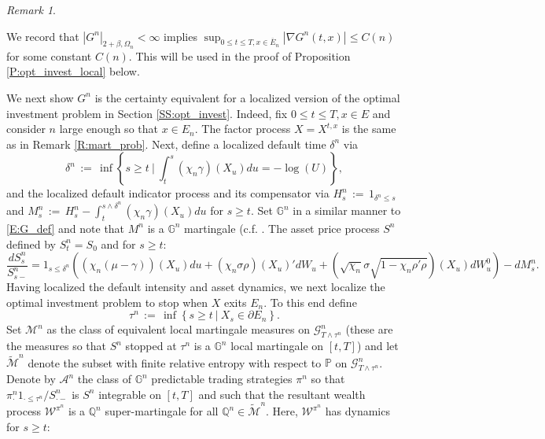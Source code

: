 \documentclass[11pt, letterpaper]{amsart}
\theoremstyle{definition}
\theoremstyle{remark}
\newtheorem{remark}[theorem]{Remark}
\numberwithin{equation}{section}
\newcommand{\such}{\ | \ }
\newcommand{\We}{\mathcal{W}}
\newcommand{\prob}{\mathbb{P}}
\newcommand{\qprob}{\mathbb{Q}}
\newcommand{\G}{\mathcal{G}}
\newcommand{\M}{\mathcal{M}}
\newcommand{\tM}{\widetilde{\mathcal{M}}}
\newcommand{\filtg}{\mathbb{G}}
\newcommand{\dfn}{\, := \,}
\newcommand{\cbra}[1]{\left\{#1\right\}}
\newcommand{\ol}[1]{\overline{#1}}
\begin{document}
\begin{remark}\label{R:gradient_bound}

We record that $|G^{n}|_{2+\beta,\Omega_n} < \infty$ implies $\sup_{0\leq t\leq T, x\in \ol{E}_n} |\nabla G^n(t,x)| \leq C(n)$ for some constant $C(n)$. This will be used in the proof of Proposition \ref{P:opt_invest_local} below.

\end{remark}



We next show $G^n$ is the certainty equivalent for a localized version of the optimal investment problem in Section \ref{SS:opt_invest}.  Indeed, fix $0\leq t\leq T, x\in E$ and consider $n$ large enough so that $x\in E_n$.  The factor process $X = X^{t,x}$ is the same as in Remark \ref{R:mart_prob}.   Next, define a localized default time $\delta^n$ via
\begin{equation}\label{E:delta_n}
\delta^n \dfn \inf\cbra{s\geq t \such \int_t^s \left(\chi_n\gamma\right)(X_u)du = -\log(U)},
\end{equation}
and the localized default indicator process and its compensator via $H^n_s \dfn 1_{\delta^n \leq s}$ and $M^n_s \dfn H^n_s - \int_t^{s\wedge\delta^n}\left(\chi_n\gamma\right)(X_u)du$ for $s\geq t$. Set $\filtg^n$ in a similar manner to \eqref{E:G_def} and note that $M^n$ is a $\filtg^n$ martingale (c.f. \cite[Theorems 1.51, 4.48]{MR2273672}. The asset price process $S^n$ defined by $S^n_t = S_0$ and for $s\geq t$:
\begin{equation}\label{E:S_n_dynamics}
\frac{dS^n_s}{S^n_{s-}}= 1_{s\leq \delta^n}\left(\left(\chi_n(\mu-\gamma)\right)(X_u) du + \left(\chi_n\sigma\rho\right)(X_u)'dW_u + \left(\sqrt{\chi_n}\sigma\sqrt{1-\chi_n\rho'\rho}\right)(X_u)dW^0_u\right) - dM^n_s.
\end{equation}
Having localized the default intensity and asset dynamics, we next localize the optimal investment problem to stop when $X$ exits $E_n$.  To this end define
\begin{equation}\label{E:tau_n}
\tau^n \dfn \inf\cbra{s\geq t \such X_s \in \partial E_n}.
\end{equation}
Set $\M^n$ as the class of equivalent local martingale measures on $\G^n_{T\wedge\tau^n}$ (these are the measures so that $S^n$ stopped at $\tau^n$ is a $\filtg^n$ local martingale on $[t,T]$) and let $\tM^n$ denote the subset with finite relative entropy with respect to $\prob$ on $\G^n_{T\wedge\tau^n}$. Denote by $\mathcal{A}^n$ the class of $\filtg^n$ predictable trading strategies $\pi^n$ so that $\pi^n_\cdot 1_{\cdot\leq \tau^n}/S^n_{\cdot-}$ is $S^n$ integrable on $[t,T]$ and such that the resultant wealth process $\We^{\pi^n}$ is a $\qprob^n$ super-martingale for all $\qprob^n\in \tM^n$. Here, $\We^{\pi^n}$ has dynamics for $s\geq t$:
\end{document}
